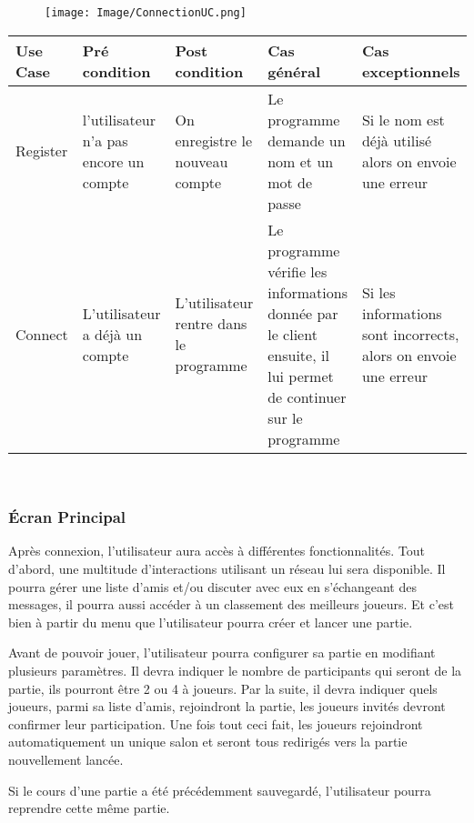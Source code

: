 \documentclass[french, utf8]{article}
\begin{document}
\begin{figure}[ht]
     \centering
    \texttt{[image: Image/ConnectionUC.png]}

\end{figure}
\begin{center}
\begin{tabular}{|m{3cm}|m{3cm}|m{3cm}|m{3cm}|m{3cm}|}
\hline  Use Case & Pré condition      &  Post condition  & Cas général & Cas exceptionnels\\
\hline Register& l'utilisateur n'a pas  encore un compte & On enregistre le nouveau compte & Le programme demande un nom et un mot de passe & Si le nom est déjà utilisé alors on envoie une erreur  \\
\hline Connect  & L'utilisateur a déjà un compte & L'utilisateur rentre dans le programme & Le programme vérifie les informations donnée par le client ensuite, il lui permet de continuer sur le programme & Si les informations sont incorrects, alors on envoie une erreur \\
\hline
\end{tabular}\\
\end{center}
\subsubsection{Écran Principal}
Après connexion, l'utilisateur aura accès à différentes fonctionnalités. Tout d'abord, une multitude d'interactions utilisant un réseau lui sera disponible. Il pourra gérer une liste d'amis et/ou discuter avec eux en s'échangeant des messages, il pourra aussi accéder à un  classement des meilleurs joueurs. Et c'est bien à partir du menu que l'utilisateur pourra créer et lancer une partie. \newline


Avant de pouvoir jouer, l'utilisateur pourra configurer sa partie en modifiant plusieurs paramètres. Il devra indiquer le nombre de participants qui seront de la partie, ils pourront être 2 ou 4 à joueurs. Par la suite, il devra indiquer quels joueurs, parmi sa liste d'amis, rejoindront la partie, les joueurs invités devront confirmer leur participation. Une fois tout ceci fait, les joueurs rejoindront automatiquement un unique salon et seront tous redirigés vers la partie nouvellement lancée. \newline

Si le cours d'une partie a été précédemment sauvegardé, l'utilisateur pourra reprendre cette même partie.
\end{document}
